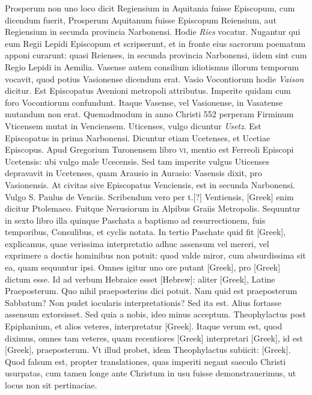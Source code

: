 Prosperum non uno
loco dicit Regiensium in Aquitania fuisse Episcopum, cum dicendum
fuerit, Prosperum Aquitanum fuisse Episcopum Reiensium,
aut Regiensium in secunda provincia Narbonensi.
Hodie \textit{Ries} vocatur.
Nugantur qui eum Regii Lepidi Episcopum et scripserunt,
et in fronte eius sacrorum poematum apponi curarunt: quasi Reienses,
in secunda provincia Narbonensi, iidem sint cum Regio Lepidi
in Aemilia.
Vasense autem consilium idiotismus illorum temporum
vocavit, quod potius Vasionense dicendum erat.
Vasio Vocontiorum hodie \textit{Vaison} dicitur.
Est Episcopatus Avenioni metropoli
attributus.
Imperite quidam cum foro Vocontiorum confundunt.
Itaque Vasense, vel Vasionense, in Vasatense mutandum non
erat.
Quemadmodum in anno Christi 552 perperam Firminum
Vticensem mutat in Venciensem.
Uticenses, vulgo dicuntur \textit{Usetz}.
Est Episcopatus in prima Narbonensi.
Dicuntur etiam Ucetenses,
et Ucetiae Episcopus.
Apud Gregorium Turonensem libro \textsc{vi},
mentio est Ferreoli Episcopi Ucetensis: ubi vulgo male Ucecensis.
Sed tam imperite vulgus Uticenses depravavit in Ucetenses, quam
Arausio in Aurasio: Vasensis dixit, pro Vasionensis.
At civitas sive
Episcopatus Venciensis, est in secunda Narbonensi. Vulgo S. Paulus
de Venciis.
Scribendum vero per t.[?] Ventiensis, \textgreek{[Greek]} enim dicitur
Ptolemaeo.
Fuitque Nerusiorum in Alpibus Graiis Metropolis.
Sequuntur in sexto libro illa quinque Paschata a baptismo
ad resurrectionem, fuis temporibus, Consulibus, et cyclis notata.
In tertio Paschate quid fit \textgreek{[Greek]}, explicamus,
quae verissima interpretatio adhuc assensum vel mereri, vel
exprimere a doctis hominibus non potuit: quod valde miror,
cum absurdissima sit ea, quam sequuntur ipsi.
Omnes igitur uno
ore putant \textgreek{[Greek]}, pro \textgreek{[Greek]} dictum esse.
Id ad verbum
Hebraice esset \texthebrew{[Hebrew]}:
 aliter \textgreek{[Greek]}, Latine Praeposterum.
Quo nihil praeposterius dici potuit.
Nam quid est praeposterum Sabbatum?
Non pudet iocularis interpretationis?
Sed ita est.
Alius fortasse assensum extorsisset.
Sed quia a nobis, ideo
minus acceptum.
Theophylactus post Epiphanium, et alios veteres,
interpretatur \textgreek{[Greek]}.
Itaque verum est, quod diximus, omnes tam veteres, quam
recentiores \textgreek{[Greek]} interpretari
 \textgreek{[Greek]}, id est \textgreek{[Greek]},
praeposterum.
Vt illud probet, idem Theophylactus
subiicit: \textgreek{[Greek]}.
{}
Quod falsum est,
propter translationes, quas imperiti negant saeculo Christi usurpatas,
cum tamen longe ante Christum in usu fuisse demonstrauerimus,
ut locus non sit pertinaciae.


